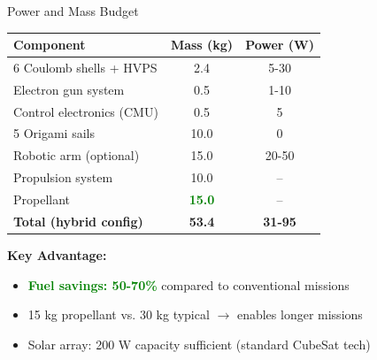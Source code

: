 \documentclass[aspectratio=169]{beamer}
\begin{document}
\begin{frame}{Power and Mass Budget}
\begin{center}
\begin{tabular}{lcc}
\toprule
\textbf{Component} & \textbf{Mass (kg)} & \textbf{Power (W)} \\
\midrule
6 Coulomb shells + HVPS & 2.4 & 5-30 \\
Electron gun system & 0.5 & 1-10 \\
Control electronics (CMU) & 0.5 & 5 \\
5 Origami sails & 10.0 & 0 \\
Robotic arm (optional) & 15.0 & 20-50 \\
Propulsion system & 10.0 & -- \\
Propellant & \textcolor{green}{\textbf{15.0}} & -- \\
\midrule
\textbf{Total (hybrid config)} & \textbf{53.4} & \textbf{31-95} \\
\bottomrule
\end{tabular}
\end{center}

\vspace{0.5cm}
\textbf{Key Advantage:}
\begin{itemize}
    \item \textcolor{green}{\textbf{Fuel savings: 50-70\%}} compared to conventional missions
    \item 15 kg propellant vs. 30 kg typical $\rightarrow$ enables longer missions
    \item Solar array: 200 W capacity sufficient (standard CubeSat tech)
\end{itemize}
\end{frame}
\end{document}
